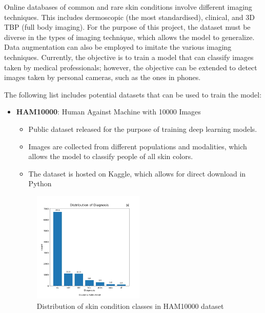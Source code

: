 \documentclass{article} %
\begin{document}
Online databases of common and rare skin conditions involve different imaging techniques. This includes dermoscopic (the most standardised), clinical, and 3D TBP (full body imaging). For the purpose of this project, the dataset must be diverse in the types of imaging technique, which allows the model to generalize. Data augmentation can also be employed to imitate the various imaging techniques. Currently, the objective is to train a model that can classify images taken by medical professionals; however, the objective can be extended to detect images taken by personal cameras, such as the ones in phones.

The following list includes potential datasets that can be used to train the model:

\begin{itemize}
\item \textbf{HAM10000}: Human Against Machine with 10000 Images \citep{ma2018machine}
\begin{itemize}
\item Public dataset released for the purpose of training deep learning models.
\item Images are collected from different populations and modalities, which allows the model to classify people of all skin colors.
\item The dataset is hosted on Kaggle, which allows for direct download in Python \citep{kastle2018skin}
\end{itemize}

\begin{figure}[!h]
\begin{center}
\includegraphics[width=0.5\textwidth]{Figs/ham10000.png}
\end{center}
\caption{Distribution of skin condition classes in HAM10000 dataset \citep{kastle2018skin}}
\end{figure}


\end{itemize}
\end{document}
